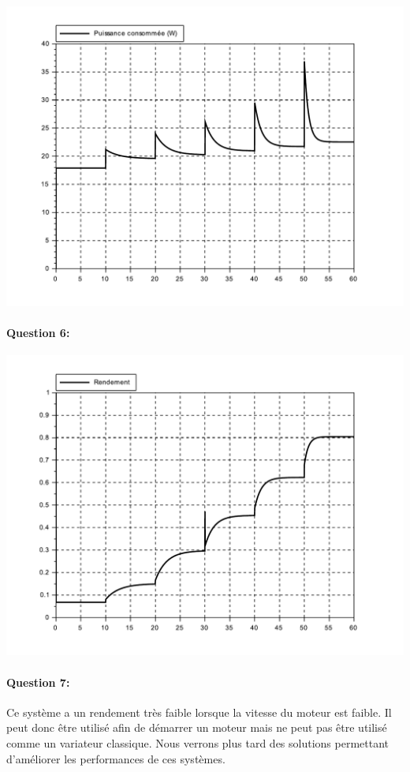 \begin{center}
 \includegraphics[width=0.8\linewidth]{img/Puissance_conso}
\end{center}

\paragraph{Question 6:}

\begin{center}
 \includegraphics[width=0.8\linewidth]{img/Rendement}
\end{center}

\paragraph{Question 7:} Ce système a un rendement très faible lorsque la vitesse du moteur est faible. Il peut donc être utilisé afin de démarrer un moteur mais ne peut pas être utilisé comme un variateur classique. Nous verrons plus tard des solutions permettant d'améliorer les performances de ces systèmes.

